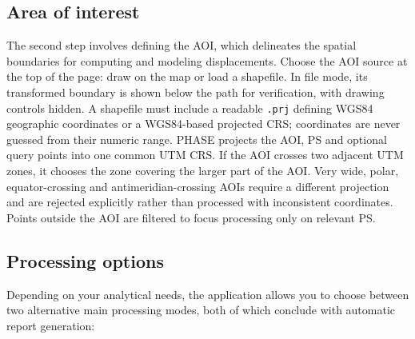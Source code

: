 \subsection{Area of interest}
The second step involves defining the AOI, which delineates the spatial boundaries for computing and modeling displacements. Choose the AOI source at the top of the page: draw on the map or load a shapefile. In file mode, its transformed boundary is shown below the path for verification, with drawing controls hidden. A shapefile must include a readable \texttt{.prj} defining WGS84 geographic coordinates or a WGS84-based projected CRS; coordinates are never guessed from their numeric range. PHASE projects the AOI, PS and optional query points into one common UTM CRS. If the AOI crosses two adjacent UTM zones, it chooses the zone covering the larger part of the AOI. Very wide, polar, equator-crossing and antimeridian-crossing AOIs require a different projection and are rejected explicitly rather than processed with inconsistent coordinates. Points outside the AOI are filtered to focus processing only on relevant PS.


\subsection{Processing options}

Depending on your analytical needs, the application allows you to choose between two alternative main processing modes, both of which conclude with automatic report generation:

